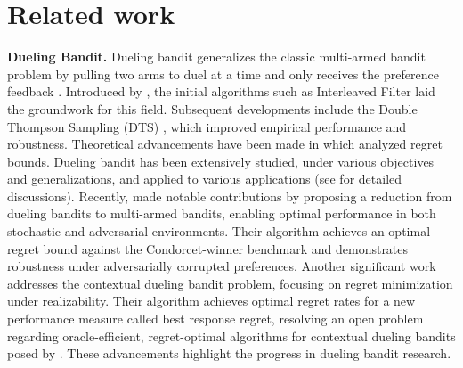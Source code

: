 \documentclass{article} %
\begin{document}
\section{Related work}

\textbf{Dueling Bandit.}
Dueling bandit generalizes the classic multi-armed bandit problem by pulling two arms to duel at a time and only receives the preference feedback \citep{yue2012k}.  Introduced by \cite{yue2012k}, the initial algorithms such as Interleaved Filter laid the groundwork for this field. Subsequent developments include the Double Thompson Sampling (DTS) \citep{wu2016double}, which improved empirical performance and robustness. Theoretical advancements have been made in \cite{komiyama2015regret} which analyzed regret bounds. Dueling bandit has been extensively studied, under various objectives and generalizations, and applied to various applications (see \cite{saha2022versatile} for detailed discussions).  
 Recently, \cite{saha2022versatile} made notable contributions by proposing a reduction from dueling bandits to multi-armed bandits, enabling optimal performance in both stochastic and adversarial environments. Their algorithm achieves an optimal regret bound against the Condorcet-winner benchmark and demonstrates robustness under adversarially corrupted preferences. Another significant work  \cite{saha2022efficient} addresses the contextual dueling bandit problem, focusing on regret minimization under realizability. Their algorithm achieves optimal regret rates for a new performance measure called best response regret, resolving an open problem regarding oracle-efficient, regret-optimal algorithms for contextual dueling bandits posed by \cite{dudik2015contextual}. These advancements highlight the progress in dueling bandit research. 
\end{document}
